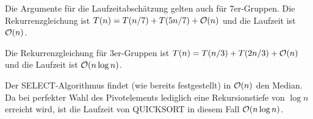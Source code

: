 \documentclass{article}
\begin{document}
\begin{solutions}
  \item Die Argumente für die Laufzeitabschätzung gelten auch für 7er-Gruppen. Die Rekurrenzgleichung ist $T(n) = T(n/7) + T(5n/7) + \mathcal{O}(n)$ und die Laufzeit ist $\mathcal{O}(n)$.
  \item Die Rekurrenzgleichung für 3er-Gruppen ist $T(n) = T(n/3) + T(2n/3) + \mathcal{O}(n)$ und die Laufzeit ist $\mathcal{O}(n \log n)$.
  \item Der SELECT-Algorithmus findet (wie bereits festgestellt) in $\mathcal{O}(n)$ den Median. Da bei perfekter Wahl des Pivotelements lediglich eine Rekursionstiefe von $\log n$ erreicht wird, ist die Laufzeit von QUICKSORT in diesem Fall $\mathcal{O}(n \log n)$.
\end{solutions}
\end{document}
